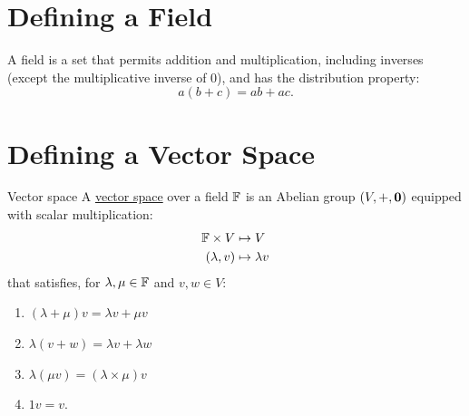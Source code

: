 \documentclass[../Main.tex]{subfiles}
\begin{document}
\section{Defining a Field}
A field is a set that permits addition and multiplication, including inverses (except the multiplicative inverse of $0$), and has the distribution property:
\begin{equation*}
    a(b+c) = ab + ac.
\end{equation*}
\section{Defining a Vector Space}
\begin{definition}{Vector space}
    A \underline{vector space} over a field $\mathbb{F}$ is an Abelian group $(V, +, \boldsymbol{0})$ equipped with scalar multiplication:
    \begin{align*}
        \mathbb{F} \times V &\mapsto V\\
        (\lambda, v) &\mapsto \lambda v
    \end{align*}
    that satisfies, for $\lambda, \mu \in \mathbb{F}$ and $v, w \in V$:
    \begin{enumerate}
        \item $(\lambda + \mu) v = \lambda v + \mu v$
        \item $\lambda(v + w) = \lambda v + \lambda w$
        \item $\lambda(\mu v) = (\lambda \times \mu) v$
        \item $1 v = v$.
    \end{enumerate}
\end{definition}
\end{document}
